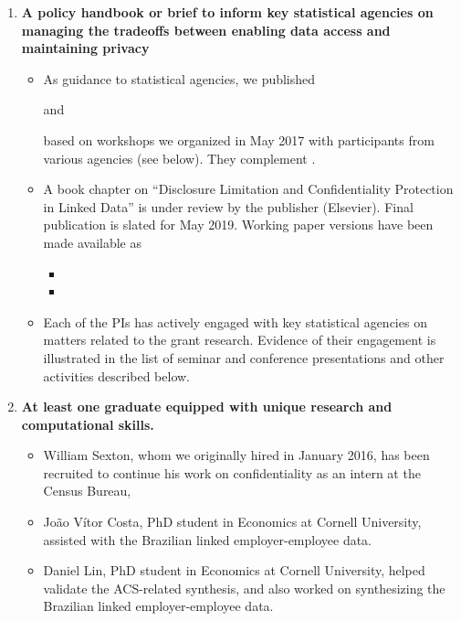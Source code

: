 \documentclass[12pt]{article}
\newcommand{\tc}[2]{%
		{#2}
	}
\newcommand{\tc}[2]{%
	\todo[size=\scriptsize]{#1}\textbf{\color{red}{#2}}
}
\begin{document}
\begin{enumerate}
	\item \textbf{A policy handbook or brief to inform key statistical agencies on managing the tradeoffs between enabling data access and maintaining privacy}
		\begin{itemize}
			\item As  guidance to statistical agencies, we  published
			\begin{quote}
			\end{quote}
		and
		\begin{quote}
		\end{quote}
			based on workshops we organized in May 2017 with participants from various agencies (see below). They complement \textcite{ProceedingsNSFSloan2016}.
			\item A book chapter on ``Disclosure Limitation and Confidentiality Protection in Linked Data'' is under review by the publisher (Elsevier). Final publication is slated for May 2019. Working paper versions have been made available as
			\begin{itemize}
				\item {}
				\item {}
			\end{itemize}
			\item Each of the PIs has actively engaged with key statistical agencies on matters related to the grant research. Evidence of their engagement is illustrated in the list of seminar and conference presentations and other activities described below.

		\end{itemize}
	\item \textbf{At least one graduate equipped with unique research and computational skills.}
		\begin{itemize}
			\item William Sexton, whom we originally hired in January 2016, has been recruited to continue his work on confidentiality as an intern at the Census Bureau, %
			\item Jo\~ao V\'itor Costa, PhD student in Economics at Cornell University, assisted with the  Brazilian linked employer-employee data.
			\item Daniel Lin, PhD student in Economics at Cornell University,  helped validate the ACS-related synthesis, and also worked on synthesizing the Brazilian linked employer-employee data.
		\end{itemize}

\end{enumerate}
\end{document}
